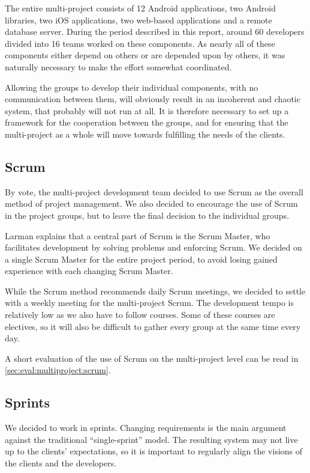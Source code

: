 The entire \giraf multi-project consists of 12 Android applications, two Android libraries, two iOS applications, two web-based applications and a remote database server.
During the period described in this report, around 60 developers divided into 16 teams worked on these components. 
As nearly all of these components either depend on others or are depended upon by others, it was naturally necessary to make the effort somewhat coordinated. 

Allowing the groups to develop their individual components, with no communication between them, will obviously result in an incoherent and chaotic system, that probably will not run at all. 
It is therefore necessary to set up a framework for the cooperation between the groups, and for ensuring that the multi-project as a whole will move towards fulfilling the needs of the clients.

\subsection{Scrum}\label{sec:collab:multiproject:scrum}
By vote, the multi-project development team decided to use Scrum as the overall method of project management. 
We also decided to encourage the use of Scrum in the project groups, but to leave the final decision to the individual groups. 

Larman \cite{larmanAgile} explains that a central part of Scrum is the Scrum Master, who facilitates development by solving problems and enforcing Scrum. 
We decided on a single Scrum Master for the entire project period, to avoid losing gained experience with each changing Scrum Master.

While the Scrum method recommends daily Scrum meetings, we decided to settle with a weekly meeting for the multi-project Scrum. The development tempo is relatively low as we also have to follow courses. 
Some of these courses are electives, so it will also be difficult to gather every group at the same time every day.

A short evaluation of the use of Scrum on the multi-project level can be read in \cref{sec:eval:multiproject:scrum}.

\subsection{Sprints}
We decided to work in sprints. 
Changing requirements is the main argument against the traditional ``single-sprint'' model. 
The resulting system may not live up to the clients' expectations, so it is important to regularly align the visions of the clients and the developers. 

